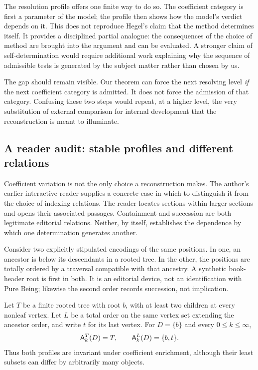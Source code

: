 The resolution profile offers one finite way to do so. The coefficient
category is first a parameter of the model; the profile then shows how
the model's verdict depends on it. This does not reproduce Hegel's claim
that the method determines itself. It provides a disciplined partial
analogue: the consequences of the choice of method are brought into the
argument and can be evaluated. A stronger claim of self-determination
would require additional work explaining why the sequence of admissible
tests is generated by the subject matter rather than chosen by us.

The gap should remain visible. Our theorem can force the next resolving
level \emph{if} the next coefficient category is admitted. It does not force
the admission of that category. Confusing these two steps would repeat,
at a higher level, the very substitution of external comparison for internal
development that the reconstruction is meant to illuminate.

\subsection{A reader audit: stable profiles and different relations}
\label{sec:readeraudit}

Coefficient variation is not the only choice a reconstruction makes.
The author's earlier interactive reader \cite{AutioReader} supplies a
concrete case in which to distinguish it from the choice of indexing
relations. The reader locates sections within larger sections and
opens their associated passages. Containment and succession are both
legitimate editorial relations. Neither, by itself, establishes the
dependence by which one determination generates another.

Consider two explicitly stipulated encodings of the same positions.
In one, an ancestor is below its descendants in a rooted tree. In the
other, the positions are totally ordered by a traversal compatible
with that ancestry. A synthetic book-header root is first in both.
It is an editorial device, not an identification with Pure Being;
likewise the second order records succession, not implication.

\begin{proposition}\label{prop:treechain}
Let $T$ be a finite rooted tree with root $b$, with at least two
children at every nonleaf vertex. Let $L$ be a total order on the same
vertex set extending the ancestor order, and write $t$ for its last
vertex. For $D=\{b\}$ and every $0\leq k\leq\infty$,
\begin{equation}\label{eq:treechain}
\mathsf A_k^T(D)=T,\qquad \mathsf A_k^L(D)=\{b,t\}.
\end{equation}
Thus both profiles are invariant under coefficient enrichment, although
their least subsets can differ by arbitrarily many objects.
\end{proposition}

